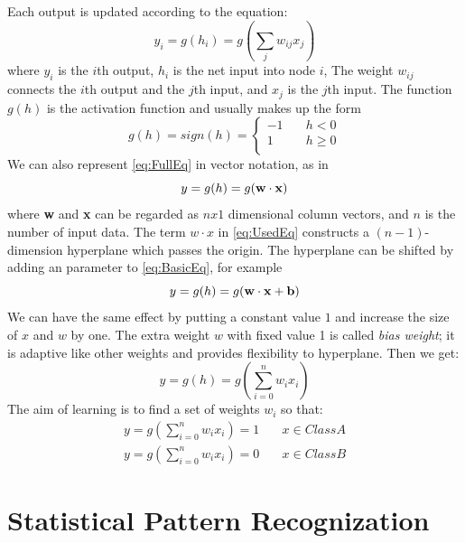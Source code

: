 Each output is updated according to the equation:
\begin{equation}\label{eq:BasicEq}
y_{i} = g(h_{i}) = g\left(\sum_{j}w_{ij}x_{j}\right)
\end{equation}
where $y_{i}$ is the $i$th output, $h_{i}$ is the net input into node $i$, The weight $w_{ij}$ connects the $i$th output and the $j$th input, and $x_{j}$ is the $j$th input. The function $g(h)$ is the activation function and usually makes up the form
\begin{equation}\label{eq:FullEq}
g(h) = sign(h) = 
  \begin{cases}
    -1       & \quad h < 0 \\
    1  & \quad h \geq 0\\
  \end{cases}
\end{equation}
We can also represent \ref{eq:FullEq} in vector notation, as in 
\begin{equation}\label{eq:UsedEq}
y = g(h) = g(\bf w \cdot x)
\end{equation}
where \textbf{w} and \textbf{x} can be regarded as $nx1$ dimensional column vectors, and $n$ is the number of input data.
The term $w \cdot x$ in \ref{eq:UsedEq} constructs a $(n-1)$-dimension hyperplane which passes the origin. The hyperplane can be shifted by adding an parameter to \ref{eq:BasicEq}, for example
\begin{equation}\label{eq:WithBias}
y = g(h) = g(\bf w \cdot x + b)
\end{equation}
We can have the same effect by putting a constant value $1$ and increase the size of $x$ and $w$ by one. The extra weight $w$ with fixed value 1 is called \textit{bias weight}; it is adaptive like other weights and provides flexibility to hyperplane. Then we get:
\begin{equation}\label{eq:finalEq}
y = g(h) = g(\sum_{i=0}^{n}w_{i}x_{i})
\end{equation}
The aim of learning is to find a set of weights $w_{i}$ so that:
\begin{align*}
y = g(\sum_{i=0}^{n}w_{i}x_{i}) = 1  & \quad x \in Class A\\
y = g(\sum_{i=0}^{n}w_{i}x_{i}) = 0  & \quad x \in Class B
\end{align*}


\section{Statistical Pattern Recognization}

